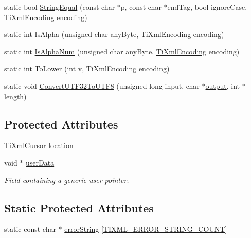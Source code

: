\begin{DoxyCompactItemize}
\item 
static bool \hyperlink{class_ti_xml_base_a51631e6986179558b9e5850723ed165a}{String\-Equal} (const char $\ast$p, const char $\ast$end\-Tag, bool ignore\-Case, \hyperlink{tinyxml_8h_a88d51847a13ee0f4b4d320d03d2c4d96}{Ti\-Xml\-Encoding} encoding)
\item 
static int \hyperlink{class_ti_xml_base_ae22522b2e8e1ac43102d16394f639fc8}{Is\-Alpha} (unsigned char any\-Byte, \hyperlink{tinyxml_8h_a88d51847a13ee0f4b4d320d03d2c4d96}{Ti\-Xml\-Encoding} encoding)
\item 
static int \hyperlink{class_ti_xml_base_a321919055c115c78ded17f85a793f368}{Is\-Alpha\-Num} (unsigned char any\-Byte, \hyperlink{tinyxml_8h_a88d51847a13ee0f4b4d320d03d2c4d96}{Ti\-Xml\-Encoding} encoding)
\item 
static int \hyperlink{class_ti_xml_base_a799f17405a86a5c2029618e85f11a097}{To\-Lower} (int v, \hyperlink{tinyxml_8h_a88d51847a13ee0f4b4d320d03d2c4d96}{Ti\-Xml\-Encoding} encoding)
\item 
static void \hyperlink{class_ti_xml_base_a07c765e3a7f979d343e646ea797b180b}{Convert\-U\-T\-F32\-To\-U\-T\-F8} (unsigned long input, char $\ast$\hyperlink{testthreadexecutor_8cpp_a2369284a02343f6cea00e0e992c138ce}{output}, int $\ast$length)
\end{DoxyCompactItemize}
\subsection*{Protected Attributes}
\begin{DoxyCompactItemize}
\item 
\hyperlink{struct_ti_xml_cursor}{Ti\-Xml\-Cursor} \hyperlink{class_ti_xml_base_a0d992580f3bc264909f898e942677a3c}{location}
\item 
void $\ast$ \hyperlink{class_ti_xml_base_ab242c01590191f644569fa89a080d97c}{user\-Data}
\begin{DoxyCompactList}\small\item\em Field containing a generic user pointer. \end{DoxyCompactList}\end{DoxyCompactItemize}
\subsection*{Static Protected Attributes}
\begin{DoxyCompactItemize}
\item 
static const char $\ast$ \hyperlink{class_ti_xml_base_a7ac8feec4100e446b3d78e1ac0659700}{error\-String} \mbox{[}\hyperlink{class_ti_xml_base_a9a7e9344415956ab96e8c75f6a0bbd48a14552894942250efcec6b00dc52fc48a}{T\-I\-X\-M\-L\-\_\-\-E\-R\-R\-O\-R\-\_\-\-S\-T\-R\-I\-N\-G\-\_\-\-C\-O\-U\-N\-T}\mbox{]}
\end{DoxyCompactItemize}
